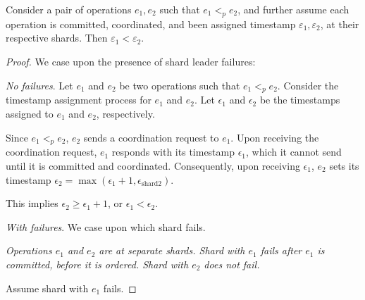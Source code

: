

\begin{lem}
\label{lemma1}
Consider a pair of operations $e_1, e_2$ such that $e_1 <_p e_2$, and further assume each operation is committed, coordinated, and been assigned timestamp $\varepsilon_1, \varepsilon_2$, at their respective shards. Then $\varepsilon_1 < \varepsilon_2$.
\end{lem}
\begin{proof}
We case upon the presence of shard leader failures:


 \textit{No failures}.
Let $e_1$ and $e_2$ be two operations such that $e_1 <_p e_2$.
Consider the timestamp assignment process for $e_1$ and $e_2$. Let $\epsilon_1$ and $\epsilon_2$ be the timestamps assigned to $e_1$ and $e_2$, respectively.

Since $e_1 <_p e_2$, $e_2$ sends a coordination request to $e_1$. Upon receiving the coordination request, $e_1$ responds with its timestamp $\epsilon_1$, which it cannot send until it is committed and coordinated. Consequently, upon receiving $\epsilon_1$, $e_2$ sets its timestamp $\epsilon_2 = \max(\epsilon_1 + 1, \epsilon_{\text{shard}2})$.

This implies $\epsilon_2 \geq \epsilon_1 + 1$, or $\epsilon_1 < \epsilon_2$.

 \textit{With failures}.
We case upon which shard fails.

 \textit{Operations $e_1$ and $e_2$ are at separate shards. Shard with $e_1$ fails after $e_1$ is \textit{committed}, before it is \textit{ordered}. Shard with $e_2$ does not fail.}

Assume shard with $e_1$ fails. 


\end{proof}
